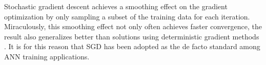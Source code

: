 Stochastic gradient descent achieves a smoothing effect on the gradient optimization by only sampling a subset of the training data for each iteration. Miraculously, this smoothing effect not only often achieves faster convergence, the result also generalizes better than solutions using deterministic gradient methods 
\citep{HardtRS15}. It is for this reason that SGD has been adopted as the de facto standard among ANN training applications.


